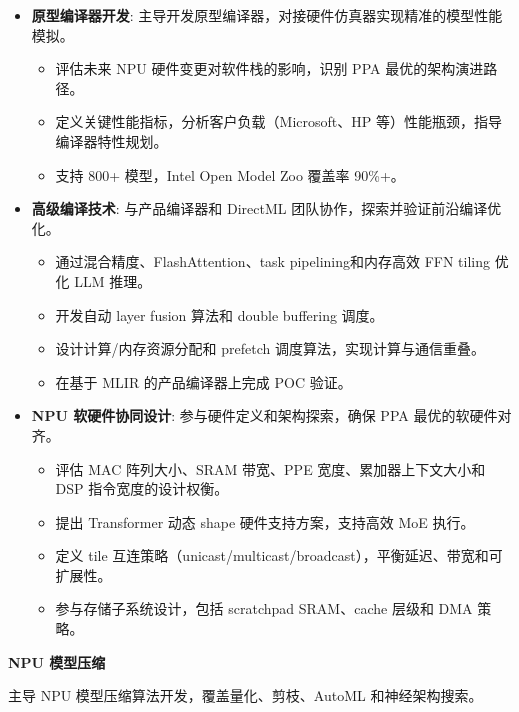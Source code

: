 \documentclass{resume_zh}
\begin{document}
\begin{itemize}

\item \textbf{原型编译器开发}: 主导开发原型编译器，对接硬件仿真器实现精准的模型性能模拟。
\begin{itemize}
  \item 评估未来 NPU 硬件变更对软件栈的影响，识别 PPA 最优的架构演进路径。
  \item 定义关键性能指标，分析客户负载（Microsoft、HP 等）性能瓶颈，指导编译器特性规划。
  \item 支持 800+ 模型，Intel Open Model Zoo 覆盖率 90\%+。
\end{itemize}

\item \textbf{高级编译技术}: 与产品编译器和 DirectML 团队协作，探索并验证前沿编译优化。
\begin{itemize}
  \item 通过混合精度、FlashAttention、task pipelining和内存高效 FFN tiling 优化 LLM 推理。
  \item 开发自动 layer fusion 算法和 double buffering 调度。
  \item 设计计算/内存资源分配和 prefetch 调度算法，实现计算与通信重叠。
  \item 在基于 MLIR 的产品编译器上完成 POC 验证。
\end{itemize}

\item \textbf{NPU 软硬件协同设计}: 参与硬件定义和架构探索，确保 PPA 最优的软硬件对齐。
\begin{itemize}
  \item 评估 MAC 阵列大小、SRAM 带宽、PPE 宽度、累加器上下文大小和 DSP 指令宽度的设计权衡。
  \item 提出 Transformer 动态 shape 硬件支持方案，支持高效 MoE 执行。
  \item 定义 tile 互连策略（unicast/multicast/broadcast），平衡延迟、带宽和可扩展性。
  \item 参与存储子系统设计，包括 scratchpad SRAM、cache 层级和 DMA 策略。
\end{itemize}

\end{itemize}

\textbf{NPU 模型压缩}

主导 NPU 模型压缩算法开发，覆盖量化、剪枝、AutoML 和神经架构搜索。
\end{document}

